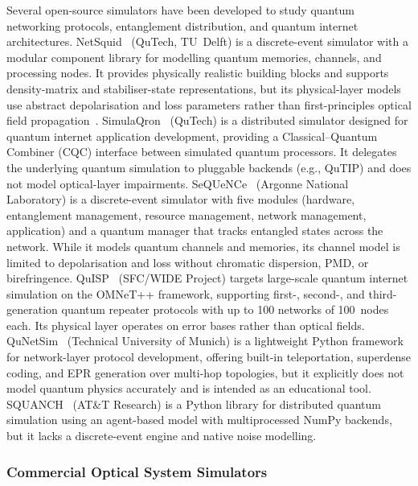 \documentclass[3p,times,preprint]{elsarticle}
\begin{document}
Several open-source simulators have been developed to study quantum
networking protocols, entanglement distribution, and quantum internet
architectures.  NetSquid~\cite{netSquid} (QuTech, TU~Delft) is a
discrete-event simulator with a modular component library for modelling
quantum memories, channels, and processing nodes.  It provides physically
realistic building blocks and supports density-matrix and stabiliser-state
representations, but its physical-layer models use abstract depolarisation
and loss parameters rather than first-principles optical field
propagation~\cite{coopmans2021}.  SimulaQron~\cite{simulaqron} (QuTech)
is a distributed simulator designed for quantum internet application
development, providing a Classical--Quantum Combiner (CQC) interface
between simulated quantum processors.  It delegates the underlying
quantum simulation to pluggable backends (e.g., QuTIP) and does not
model optical-layer impairments.  SeQUeNCe~\cite{sequence} (Argonne
National Laboratory) is a discrete-event simulator with five modules
(hardware, entanglement management, resource management, network
management, application) and a quantum manager that tracks entangled
states across the network.  While it models quantum channels and
memories, its channel model is limited to depolarisation and loss
without chromatic dispersion, PMD, or birefringence.  QuISP~\cite{quisp}
(SFC/WIDE Project) targets large-scale quantum internet simulation
on the OMNeT++ framework, supporting first-, second-, and third-generation
quantum repeater protocols with up to 100 networks of 100~nodes each.
Its physical layer operates on error bases rather than optical fields.
QuNetSim~\cite{qunetsim} (Technical University of Munich) is a
lightweight Python framework for network-layer protocol development,
offering built-in teleportation, superdense coding, and EPR generation
over multi-hop topologies, but it explicitly does not model quantum
physics accurately and is intended as an educational tool.
SQUANCH~\cite{squanch} (AT\&T Research) is a Python library for
distributed quantum simulation using an agent-based model with
multiprocessed NumPy backends, but it lacks a discrete-event engine
and native noise modelling.

\subsubsection{Commercial Optical System Simulators}
\end{document}
